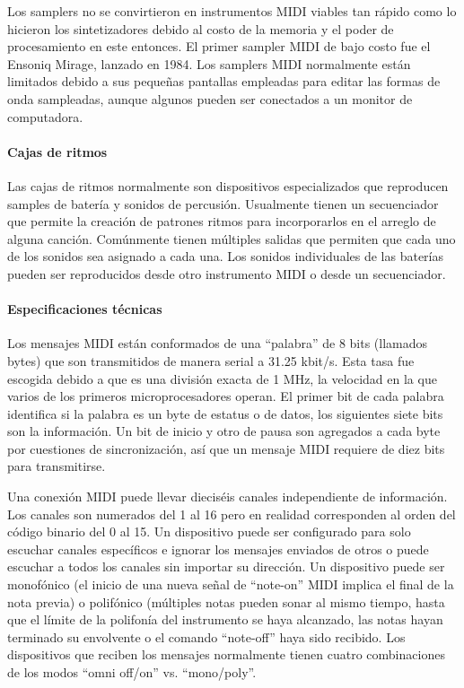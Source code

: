 \documentclass[a4paper,11pt,oneside]{book}
\begin{document}
Los samplers no se convirtieron en instrumentos MIDI viables tan rápido como lo hicieron los sintetizadores debido al costo de la memoria y el poder de procesamiento en este entonces. El primer sampler MIDI de bajo costo fue el Ensoniq Mirage, lanzado en 1984. Los samplers MIDI normalmente están limitados debido a sus pequeñas pantallas empleadas para editar las formas de onda sampleadas, aunque algunos pueden ser conectados a un monitor de computadora.


\paragraph{Cajas de ritmos}


Las cajas de ritmos normalmente son dispositivos especializados que reproducen samples de batería y sonidos de percusión. Usualmente tienen un secuenciador que permite la creación de patrones ritmos para incorporarlos en el arreglo de alguna canción. Comúnmente tienen múltiples salidas que permiten que cada uno de los sonidos sea asignado a cada una. Los sonidos individuales de las baterías pueden ser reproducidos desde otro instrumento MIDI o desde un secuenciador.

\paragraph{Especificaciones técnicas}

Los mensajes MIDI están conformados de una ``palabra'' de 8 bits (llamados bytes) que son transmitidos de manera serial a 31.25 kbit/s. Esta tasa fue escogida debido a que es una división exacta de 1 MHz, la velocidad en la que varios de los primeros microprocesadores operan. El primer bit de cada palabra identifica si la palabra es un byte de estatus o de datos, los siguientes siete bits son la información. Un bit de inicio y otro de pausa son agregados a cada byte por cuestiones de sincronización, así que un mensaje MIDI requiere de diez bits para transmitirse.

Una conexión MIDI puede llevar dieciséis canales independiente de información. Los canales son numerados del 1 al 16 pero en realidad corresponden al orden del código binario del 0 al 15. Un dispositivo puede ser configurado para solo escuchar canales específicos e ignorar los mensajes enviados de otros o puede escuchar a todos los canales sin importar su dirección. Un dispositivo puede ser monofónico (el inicio de una nueva señal de ``note-on'' MIDI implica el final de la nota previa) o polifónico (múltiples notas pueden sonar al mismo tiempo, hasta que el límite de la polifonía del instrumento se haya alcanzado, las notas hayan terminado su envolvente o el comando ``note-off'' haya sido recibido. Los dispositivos que reciben los mensajes normalmente tienen cuatro combinaciones de los modos ``omni off/on'' vs. ``mono/poly''.
\end{document}
